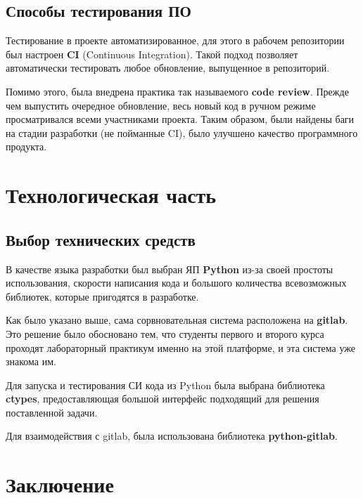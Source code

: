 \documentclass[a4paper,12pt]{article}
\begin{document}
\subsection{Способы тестирования ПО}

\noindent Тестирование в проекте автоматизированное, для этого в рабочем репозитории был настроен \textbf{CI} (Continuous Integration). Такой подход позволяет автоматически тестировать любое обновление, выпущенное в репозиторий. \newline

\noindent Помимо этого, была внедрена практика так называемого \textbf{code review}. Прежде чем выпустить очередное обновление, весь новый код в ручном режиме просматривался всеми участниками проекта. Таким образом, были найдены баги на стадии разработки (не пойманные CI), было улучшено качество программного продукта.

\section{Технологическая часть}

\subsection{Выбор технических средств}

\noindent В качестве языка разработки был выбран ЯП \textbf{Python} из-за своей простоты использования, скорости написания кода и большого количества всевозможных библиотек, которые пригодятся в разработке. \newline

\noindent Как было указано выше, сама сорвновательная система расположена на \textbf{gitlab}. Это решение было обосновано тем, что студенты первого и второго курса проходят лабораторный практикум именно на этой платформе, и эта система уже знакома им. \newline

\noindent Для запуска и тестирования СИ кода из Python была выбрана библиотека \textbf{ctypes}, предоставляющая большой интерфейс подходящий для решения поставленной задачи. \newline

\noindent Для взаимодействия с gitlab, была использована библиотека \textbf{python-gitlab}. 

\section{Заключение}
\end{document}
